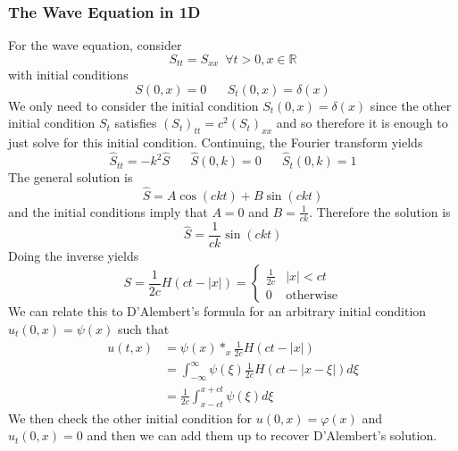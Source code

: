 \documentclass{article}
\newcommand{\R}{\mathbb{R}}
\newcommand{\twen}{\hspace{20pt}}
\newcommand{\push}{\,\,\,}
\theoremstyle{definition}
\begin{document}
\subsubsection{The Wave Equation in 1D}
For the wave equation, consider 
\begin{equation*}
    S_{tt} = S_{xx} \push \forall t>0, x\in \R
\end{equation*}
with initial conditions 
\begin{equation*}
    S(0,x) = 0 \twen S_t(0,x) = \delta (x)
\end{equation*}
We only need to consider the initial condition $S_t(0,x) = \delta(x)$ since the other initial condition $S_t$ satisfies $(S_t)_{tt} = c^2 (S_t)_{xx}$ and so therefore it is enough to just solve for this initial condition. Continuing, the Fourier transform yields 
\begin{equation*}
    \hat S_{tt} = -k^2 \hat S \twen \hat S(0,k) = 0 \twen \hat S_t(0,k) = 1
\end{equation*}
The general solution is 
\begin{equation*}
    \hat S = A\cos (ckt)+B\sin(ckt)
\end{equation*}
and the initial conditions imply that $A=0$ and $B = \frac{1}{ck}$. Therefore the solution is 
\begin{equation*}
    \hat S = \frac{1}{ck} \sin(ckt)
\end{equation*}
Doing the inverse yields 
\begin{equation*}
    S = \frac{1}{2c} H(ct-|x|) = \begin{cases}
        \frac{1}{2c} &  |x| < ct \\
        0 & \text{otherwise}
    \end{cases}
\end{equation*}
We can relate this to D'Alembert's formula for an arbitrary initial condition $u_t(0,x) = \psi(x)$ such that 
\begin{equation*}
    \begin{split}
        u(t,x) &= \psi (x) *_x \frac{1}{2c} H(ct-|x|) \\
        &= \int^\infty_{-\infty} \psi(\xi) \frac{1}{2c} H(ct-|x-\xi|) d\xi \\
        &= \frac{1}{2c} \int^{x+ct}_{x-ct} \psi(\xi) d\xi
    \end{split}
\end{equation*}
We then check the other initial condition for $u(0,x) = \varphi(x)$ and $u_t(0,x) = 0$ and then we can add them up to recover D'Alembert's solution.
\end{document}
